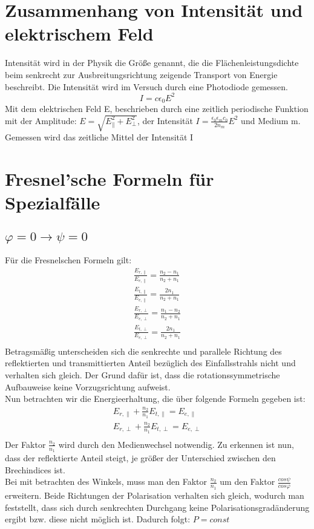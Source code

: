 \section{Zusammenhang von Intensität und elektrischem Feld}
Intensität wird in der Physik die Größe genannt, die die Flächenleistungsdichte beim senkrecht zur Ausbreitungsrichtung zeigende Transport von Energie beschreibt. 
Die Intensität wird im Versuch durch eine Photodiode gemessen. 
\begin{equation}
I=c\epsilon_0 E^2
\end{equation}
Mit dem elektrischen Feld E, beschrieben durch eine zeitlich periodische Funktion mit der Amplitude: $E=\sqrt{E_{\parallel}^2 +E^2_{\perp}}$, der Intensität $I=\frac{\epsilon_0\epsilon_mc_0}{2n_m}E^2$ und Medium m.
Gemessen wird das zeitliche Mittel der Intensität I



\section{Fresnel'sche Formeln für  Spezialfälle }
\subsection*{$\varphi=0\rightarrow\psi=0$}
Für die Fresnelschen Formeln gilt:
\begin{align*}
\frac{E_{r,\parallel}}{E_{e,\parallel}}=\frac{n_2-n_1}{n_2+n_1}\\
\frac{E_{t,\parallel}}{E_{e,\parallel}}=\frac{2n_1}{n_2+n_1}\\
\frac{E_{r,\perp}}{E_{e,\perp}}=\frac{n_1-n_2}{n_2+n_1}\\
\frac{E_{t,\perp}}{E_{e,\perp}}=\frac{2n_1}{n_2+n_1}\\
\end{align*}
Betragsmäßig unterscheiden sich die senkrechte und parallele Richtung des reflektierten und transmittierten Anteil bezüglich des Einfallsstrahls nicht und verhalten sich gleich. Der Grund dafür ist, dass die rotationssymmetrische Aufbauweise keine Vorzugsrichtung aufweist. \\
Nun betrachten wir die Energieerhaltung, die über folgende Formeln gegeben ist:
\begin{align*}
E_{r,\parallel}+\frac{n_2}{n_1}E_{t,\parallel}=E_{e,\parallel}\\
E_{r,\perp}+\frac{n_2}{n_1}E_{t,\perp}=E_{e,\perp}\\
\end{align*}
Der Faktor $\frac{n_2}{n_1}$ wird durch den Medienwechsel notwendig. Zu erkennen ist nun, dass der reflektierte Anteil steigt, je größer der Unterschied zwischen den Brechindices ist. \\
Bei mit betrachten des Winkels, muss man den Faktor $\frac{n_2}{n_1}$  um den Faktor $\frac{cos\psi}{cos\varphi}$ erweitern. 
Beide Richtungen der Polarisation verhalten sich gleich, wodurch man feststellt, dass sich durch senkrechten Durchgang keine Polarisationsgradänderung ergibt bzw. diese nicht möglich ist. Dadurch folgt: $P=const$

